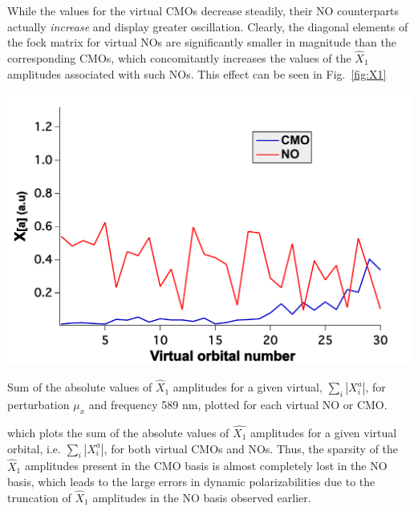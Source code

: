 While the values for the virtual CMOs decrease steadily, their NO counterparts actually {\em increase}
and display greater oscillation.  Clearly, the diagonal elements of the fock
matrix for virtual NOs are significantly smaller in magnitude than the
corresponding CMOs, which concomitantly increases the values of the
$\hat{X}_1$ amplitudes associated with such NOs.  This effect can be seen in
Fig.~\ref{fig:X1} 
\begin{MyFigure}[h!]
\centering
\includegraphics[width=0.6\linewidth,natwidth=610,natheight=642]{figures_fvno/X1.pdf}
\caption{{\footnotesize  Sum of the absolute values of $\hat{X}_1$
amplitudes for a given virtual, $\sum_i \left|X_i^a\right|$, for perturbation $\mu_x$
and frequency 589 nm, plotted for each virtual NO or CMO.}}
\label{fig:X1}
\end{MyFigure}
which plots the sum of the absolute values of $\hat{X_1}$
amplitudes for a given virtual orbital, i.e.  $\sum_i |X_i^a|$, for both
virtual CMOs and NOs.  Thus, the sparsity of the $\hat{X}_1$ amplitudes present in the
CMO basis is almost completely lost in the NO basis, which leads to the large
errors in dynamic polarizabilities due to the truncation of $\hat{X}_1$
amplitudes in the NO basis observed earlier.  

